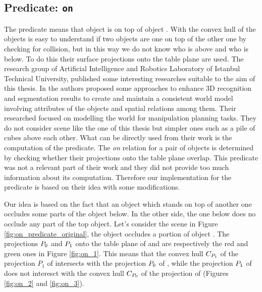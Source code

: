 \subsection{Predicate: \texttt{on}}
The  predicate means that object  is on top of object . With the convex hull of the objects is easy to understand if two objects are one on top of the other one by checking for collision, but in this way we do not know who is above and who is below. To do this their surface projections onto the table plane are used. 
The research group of Artificial Intelligence and Robotics Laboratory of
Istanbul Technical University, published some interesting researches suitable to the aim of this thesis. In \citep{ersen2014scene} \citep{SSS147762} \citep{ersen2013extracting} the authors proposed some approaches to enhance
 3D recognition and segmentation results to create and maintain a consistent world model involving attributes of the objects and spatial relations among them. Their researched focused on modelling the world for manipulation planning tasks. They do not consider scene like the one of this thesis but simpler ones such as  a pile of cubes above each other. What can be directly used from their work is the computation of the  predicate. The \textit{on} relation for a pair of objects is determined by checking whether their projections onto the table plane overlap. This predicate was not a relevant part of their work and they did not provide too much information about its computation. Therefore our implementation for the  predicate is based on their idea with some modifications. 
 
Our idea is based on the fact that an object which stands on top of another one occludes some parts of the object below. In the other side, the one below does no occlude any part of the top object. 
Let's consider the scene in Figure \ref{fig:on_predicate_original}, the object  occludes a portion of object . The projections ${\sc P_{0}}$ and ${\sc P_{1}}$ onto the table plane of  and  are respectively the red and green ones in Figure \ref{fig:on_1}. This means that the convex hull ${\sc C_{P_{1}}}$ of the projection $P_{1}$ of  intersects with the projection ${\sc P_{0}}$ of , while the projection ${\sc P_{1}}$ of  does not interesct with the convex hull ${\sc C_{P_{0}}}$ of the projection of  (Figures \ref{fig:on_2} and \ref{fig:on_3}). 


